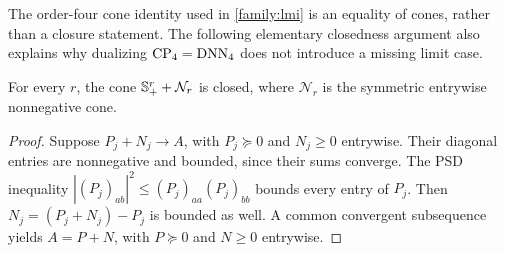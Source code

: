 The order-four cone identity used in \cref{family:lmi} is an equality of
cones, rather than a closure statement. The following elementary
closedness argument also explains why dualizing $\operatorname{CP}_4=\operatorname{DNN}_4$ does
not introduce a missing limit case.

\begin{lemma}
\label{family:spn-closed}
For every $r$, the cone $\mathbb S^r_++\mathcal N_r$ is closed, where
$\mathcal N_r$ is the symmetric entrywise nonnegative cone.
\end{lemma}

\begin{proof}
Suppose $P_j+N_j\to A$, with $P_j\succeq0$ and $N_j\ge0$ entrywise.
Their diagonal entries are nonnegative and bounded, since their sums
converge. The PSD inequality
$|(P_j)_{ab}|^2\le(P_j)_{aa}(P_j)_{bb}$ bounds every entry of $P_j$.
Then $N_j=(P_j+N_j)-P_j$ is bounded as well. A common convergent
subsequence yields $A=P+N$, with $P\succeq0$ and $N\ge0$ entrywise.
\end{proof}
